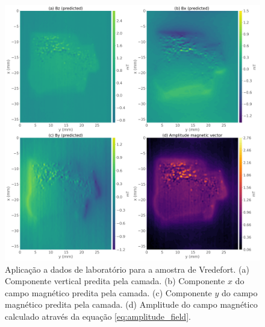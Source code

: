 \begin{figure}
	\centering
	\includegraphics[width=1.\textwidth]{Fig/mag_vec/aplicacao_vredefort/field_components_eqlayer.png}
	\caption{Aplicação a dados de laboratório para a amostra de Vredefort. (a) Componente vertical predita pela camada. (b) Componente $x$ do campo magnético predita pela camada. (c) Componente $y$ do campo magnético predita pela camada. (d) Amplitude do campo magnético calculado através da equação \ref{eq:amplitude_field}.}
	\label{fig:components_real_sample}
\end{figure}

